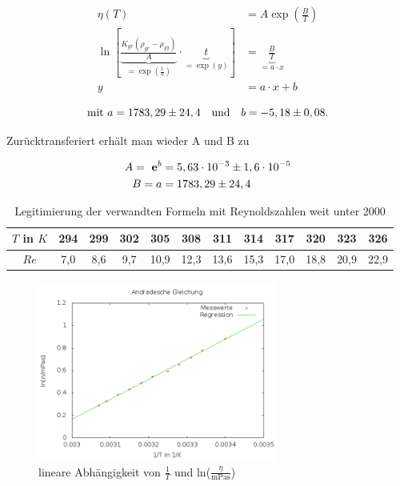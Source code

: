 \begin{align*}
 \eta(T) &= A \exp \left(\frac{B}{T}\right) \\
 \ln \left[ \underbrace{\frac{K_{gr}(\rho_{gr}-\rho_{Fl})}{A}}_{=\exp \left(\frac1b\right)} \cdot \underbrace{t}_{=\exp(y)}  \right] &= \underbrace{\frac{B}{T}}_{=a\cdot x}\\
 y &= a\cdot x + b
\end{align*}

\begin{equation}
\text{mit } a = 1783,29\pm 24,4 \quad \text{und} \quad b = -5,18 \pm 0,08.\\
\end{equation}

Zurücktransferiert erhält man wieder A und B zu

\begin{align}
 A = \ \mathbf{e}^b &= 5,63 \cdot 10^{-3} \pm 1,6 \cdot 10^{-5}\\
 B = a &= 1783,29 \pm 24,4
\end{align}

\begin{table}[H]
 \begin{tabular}{c|c|c|c|c|c|c|c|c|c|c|c}
  $T$ in $K$ & 294 & 299 & 302 & 305 & 308 & 311 & 314 & 317 & 320 & 323 & 326 \\
  \hline
  $Re$ & 7,0 &	8,6	&9,7	&10,9	&12,3	&13,6	&15,3	&17,0	&18,8	&20,9	&22,9
 \end{tabular}
\caption{Legitimierung der verwandten Formeln mit Reynoldszahlen weit unter 2000}
\end{table}


\begin{figure}[H]
\includegraphics[width=0.7\textwidth] {pics/Andrade.png}
\centering
\caption{lineare Abhängigkeit von $\frac1T$ und ln($\frac{\eta}{\text{mPas}}$)}
\end{figure}


